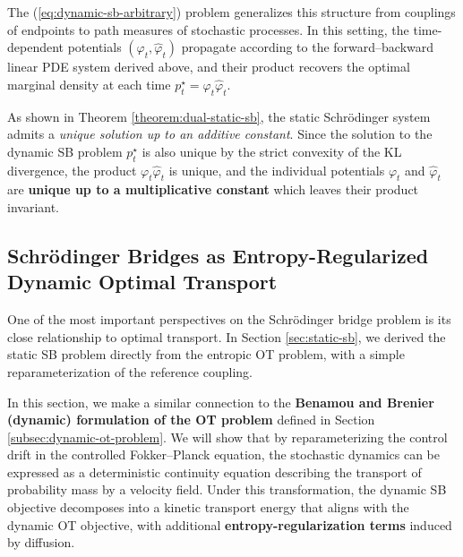 \documentclass{article}
\begin{document}
The (\ref{eq:dynamic-sb-arbitrary}) problem generalizes this structure from couplings of endpoints to path measures of stochastic processes. In this setting, the time-dependent potentials $(\varphi_t,\hat\varphi_t)$ propagate according to the forward–backward linear PDE system derived above, and their product recovers the optimal marginal density at each time $p_t^\star=\varphi_t\hat\varphi_t$. 

As shown in Theorem \ref{theorem:dual-static-sb}, the static Schrödinger system admits a \textit{unique solution up to an additive constant}. Since the solution to the dynamic SB problem $p^\star_t$ is also unique by the strict convexity of the KL divergence, the product $\varphi_t\hat\varphi_t$ is unique, and the individual potentials $\varphi_t$ and $\hat\varphi_t$ are \textbf{unique up to a multiplicative constant} which leaves their product invariant.

\subsection{Schrödinger Bridges as Entropy-Regularized Dynamic Optimal Transport}
\label{subsec:sb-regularized-dynamic-ot}

One of the most important perspectives on the Schrödinger bridge problem is its close relationship to optimal transport. In Section \ref{sec:static-sb}, we derived the static SB problem directly from the entropic OT problem, with a simple reparameterization of the reference coupling. 

In this section, we make a similar connection to the \textbf{Benamou and Brenier (dynamic) formulation of the OT problem} defined in Section \ref{subsec:dynamic-ot-problem}. We will show that by reparameterizing the control drift in the controlled Fokker–Planck equation, the stochastic dynamics can be expressed as a deterministic continuity equation describing the transport of probability mass by a velocity field. Under this transformation, the dynamic SB objective decomposes into a kinetic transport energy that aligns with the dynamic OT objective, with additional \textbf{entropy-regularization terms} induced by diffusion.
\end{document}
